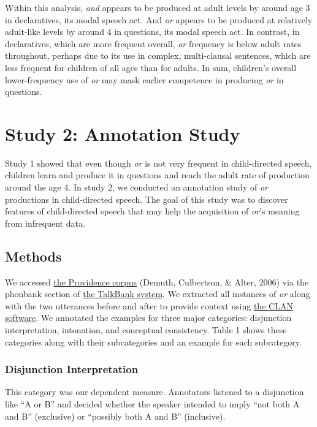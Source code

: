\documentclass[10pt, letterpaper]{article}
\begin{document}
Within this analysis, \emph{and} appears to be produced at adult levels
by around age 3 in declaratives, its modal speech act. And \emph{or}
appears to be produced at relatively adult-like levels by around 4 in
questions, its modal speech act. In contrast, in declaratives, which are
more frequent overall, \emph{or} frequency is below adult rates
throughout, perhaps due to its use in complex, multi-clausal sentences,
which are less frequent for children of all ages than for adults. In
sum, children's overall lower-frequency use of \emph{or} may mask
earlier competence in producing \emph{or} in questions.

\section{Study 2: Annotation Study}\label{study-2-annotation-study}

Study 1 showed that even though \emph{or} is not very frequent in
child-directed speech, children learn and produce it in questions and
reach the adult rate of production around the age 4. In study 2, we
conducted an annotation study of \emph{or} productions in child-directed
speech. The goal of this study was to discover features of
child-directed speech that may help the acquisition of \emph{or}'s
meaning from infrequent data.

\subsection{Methods}\label{methods-1}

We accessed
\href{https://phonbank.talkbank.org/browser/index.php?url=Eng-NA/Providence/}{the
Providence corpus} (Demuth, Culbertson, \& Alter, 2006) via the phonbank
section of \href{https://talkbank.org/}{the TalkBank system}. We
extracted all instances of \emph{or} along with the two utterances
before and after to provide context using
\href{http://alpha.talkbank.org/clan/}{the CLAN software}. We annotated
the examples for three major categories: disjunction interpretation,
intonation, and conceptual consistency. Table 1 shows these categories
along with their subcategories and an example for each subcategory.

\subsubsection{Disjunction
Interpretation}\label{disjunction-interpretation}

This category was our dependent measure. Annotators listened to a
disjunction like ``A or B'' and decided whether the speaker intended to
imply ``not both A and B'' (exclusive) or ``possibly both A and B''
(inclusive).
\end{document}
